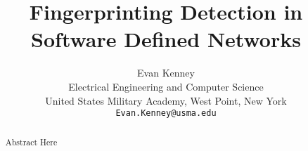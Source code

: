 \documentclass{article}
\begin{document}
\title{Fingerprinting Detection in Software Defined Networks}
\author{Evan Kenney\\
	Electrical Engineering and Computer Science\\
	United States Military Academy, West Point, New York\\
	\texttt{Evan.Kenney@usma.edu}}
\maketitle

\begin{abstract}

Abstract Here

\end{abstract}
\end{document}
